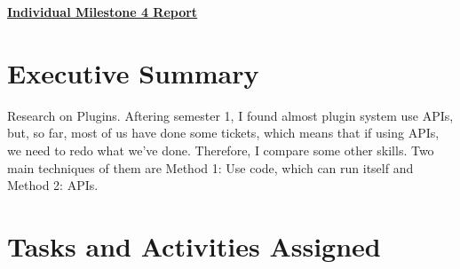 \begin{center}
{\textbf{\underline{{Individual Milestone 4 Report}}}}
\end{center}

\section*{Executive Summary}

Research on Plugins. Aftering semester 1, I found almost plugin system use APIs, but, so far, most of us have done some tickets, which means that if using APIs, we need to redo what we've done. Therefore, I compare some other skills. Two main techniques of them are Method 1: Use code, which can run itself and Method 2: APIs.

\section*{Tasks and Activities Assigned}

